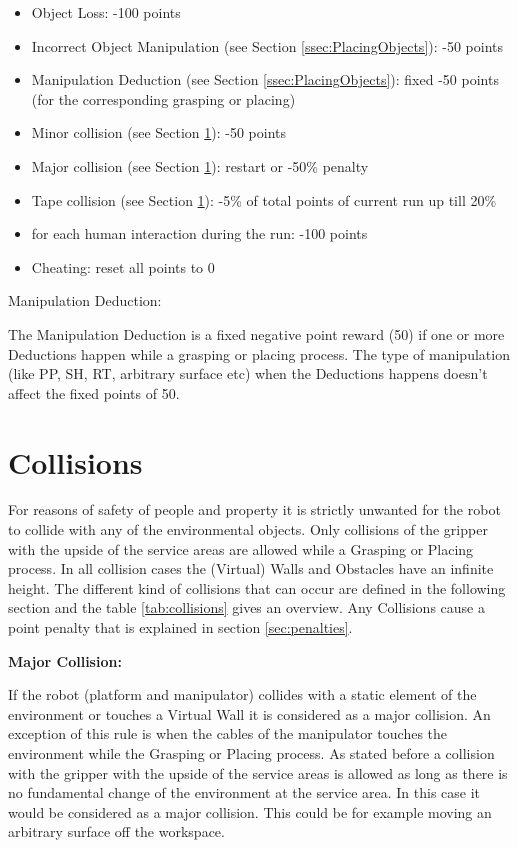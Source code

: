 \begin{itemize}
	\item Object Loss: \hfill -100 points
	\item Incorrect Object Manipulation (see Section \ref{ssec:PlacingObjects}): \hfill -50 points
	\item Manipulation Deduction (see Section \ref{ssec:PlacingObjects}): \hfill fixed -50 points (for the corresponding grasping or placing)
	\item Minor collision (see Section \ref{sec:Collisions}): \hfill -50 points
	\item Major collision (see Section \ref{sec:Collisions}): \hfill restart or -50\% penalty
  \item Tape collision (see Section \ref{sec:Collisions}): \hfill -5\% of total points of current run up till
  20\%
  \item for each human interaction during the run: \hfill  -100 points
  \item Cheating: \hfill reset all points to 0
\end{itemize}

Manipulation Deduction:

The Manipulation Deduction is a fixed negative point reward (50) if one or more Deductions happen while a grasping or placing process. The type of manipulation (like PP, SH, RT, arbitrary surface etc) when the Deductions happens doesn't affect the fixed points of 50.

\section{Collisions}\label{sec:Collisions}

For reasons of safety of people and property it is strictly unwanted for the robot to collide
with any of the environmental objects. Only collisions of the gripper with the upside of
the service areas are allowed while a Grasping or Placing process. In all collision cases the (Virtual) Walls and Obstacles have an infinite height. The different kind of collisions that can occur are defined in the
following section and the table \ref{tab:collisions} gives an overview. Any Collisions cause a point penalty that is explained in section \ref{sec:penalties}.  

\textbf{Major Collision:}

If the robot (platform and manipulator) collides with a static element of the environment or touches a Virtual Wall it is considered as a major collision. An exception of this rule is when the cables of the manipulator touches the environment while the Grasping or Placing process. As stated before a collision with the  gripper with the upside of the service areas is allowed as long as there is no fundamental change of the environment at the service area. In this case it would be considered as a major collision. This could be for example moving an arbitrary surface off the workspace. 


